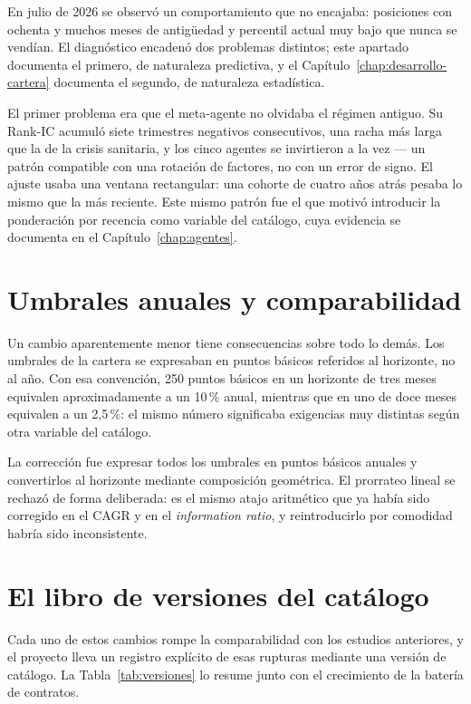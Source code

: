 En julio de 2026 se observó un comportamiento que no encajaba: posiciones con ochenta y muchos meses
de antigüedad y percentil actual muy bajo que nunca se vendían. El diagnóstico encadenó dos
problemas distintos; este apartado documenta el primero, de naturaleza predictiva, y el
Capítulo~\ref{chap:desarrollo-cartera} documenta el segundo, de naturaleza estadística.

El primer problema era que el meta-agente no olvidaba el régimen antiguo. Su Rank-IC acumuló siete
trimestres negativos consecutivos, una racha más larga que la de la crisis sanitaria, y los cinco
agentes se invirtieron a la vez --- un patrón compatible con una rotación de factores, no con un
error de signo. El ajuste usaba una ventana rectangular: una cohorte de cuatro años atrás pesaba lo
mismo que la más reciente. Este mismo patrón fue el que motivó introducir la ponderación por
recencia como variable del catálogo, cuya evidencia se documenta en el
Capítulo~\ref{chap:agentes}.

\section{Umbrales anuales y comparabilidad}

Un cambio aparentemente menor tiene consecuencias sobre todo lo demás. Los umbrales de la cartera se
expresaban en puntos básicos referidos al horizonte, no al año. Con esa convención, 250 puntos
básicos en un horizonte de tres meses equivalen aproximadamente a un 10\,\% anual, mientras que en
uno de doce meses equivalen a un 2,5\,\%: el mismo número significaba exigencias muy distintas según
otra variable del catálogo.

La corrección fue expresar todos los umbrales en puntos básicos anuales y convertirlos al horizonte
mediante composición geométrica. El prorrateo lineal se rechazó de forma deliberada: es el mismo
atajo aritmético que ya había sido corregido en el CAGR y en el \textit{information ratio}, y
reintroducirlo por comodidad habría sido inconsistente.

\section{El libro de versiones del catálogo}

Cada uno de estos cambios rompe la comparabilidad con los estudios anteriores, y el proyecto lleva
un registro explícito de esas rupturas mediante una versión de catálogo. La
Tabla~\ref{tab:versiones} lo resume junto con el crecimiento de la batería de contratos.

